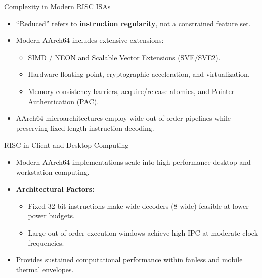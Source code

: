 \documentclass[aspectratio=169,11pt,t]{beamer}
\newcommand{\key}[1]{\textbf{#1}}
\begin{document}
\begin{frame}{Complexity in Modern RISC ISAs}
\large
\begin{itemize}\setlength{\itemsep}{8pt}
  \item ``Reduced'' refers to \key{instruction regularity}, not a constrained feature set.
  \item Modern AArch64 includes extensive extensions:
  \begin{itemize}\setlength{\itemsep}{4pt}
    \item SIMD / NEON and Scalable Vector Extensions (SVE/SVE2).
    \item Hardware floating-point, cryptographic acceleration, and virtualization.
    \item Memory consistency barriers, acquire/release atomics, and Pointer Authentication (PAC).
  \end{itemize}
  \item AArch64 microarchitectures employ wide out-of-order pipelines while preserving fixed-length instruction decoding.
\end{itemize}
\end{frame}


\begin{frame}{RISC in Client and Desktop Computing}
\large
\begin{itemize}\setlength{\itemsep}{8pt}
  \item Modern AArch64 implementations scale into high-performance desktop and workstation computing.
  \item \key{Architectural Factors:}
  \begin{itemize}\setlength{\itemsep}{4pt}
    \item Fixed 32-bit instructions make wide decoders ($8\text{ wide}$) feasible at lower power budgets.
    \item Large out-of-order execution windows achieve high IPC at moderate clock frequencies.
  \end{itemize}
  \item Provides sustained computational performance within fanless and mobile thermal envelopes.
\end{itemize}
\end{frame}

\end{document}
